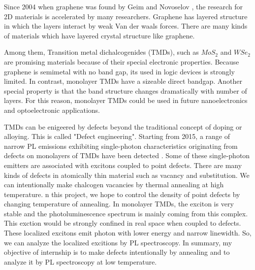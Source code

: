 
Since 2004 when graphene was found by Geim and Novoselov \cite{novoselov2004electric}, the research for 2D materials is accelerated by many researchers. Graphene has layered structure in which the layers interact by weak Van der waals forces. There are many kinds of materials which have layered crystal structure like graphene. 

Among them, Transition metal dichalcogenides (TMDs), such as $MoS_2$ and $WSe_2$ are promising materials because of their special electronic properties.
Because graphene is semimetal with no band gap, its used in logic devices is strongly limited. In contrast, monolayer TMDs have a sizeable direct bandgap. Another special property is that the band structure changes dramatically with number of layers. For this reason, monolayer TMDs could be used in future nanoelectronics and optoelectronic applications.

TMDs can be enigeered by defects beyond the traditional concept of doping or alloying. This is called "Defect engineering". Starting from 2015, a range of narrow PL emissions exhibiting single-photon characteristics originating from defects on monolayers of TMDs have been detected \cite{article}. Some of these single-photon emitters are associated with excitons coupled to point defects. There are many kinds of defects in atomically thin material such as vacancy and substitution. We can intentionally make chalcogen vacancies by thermal annealing at high temperature. n this project, we hope to control the density of point defects by changing temperature of annealing. In monolayer TMDs, the exciton is very stable and the photoluminescence spectrum is mainly coming from this complex. This exction would be strongly confined in real space when coupled to defects. These localized excitons emit photon with lower energy and narrow linewidth. So, we can analyze the localized excitions by PL spectroscopy.  In summary, my objective of internship is to make defects intentionally by annealing and to analyze it by PL spectroscopy at low temperature.